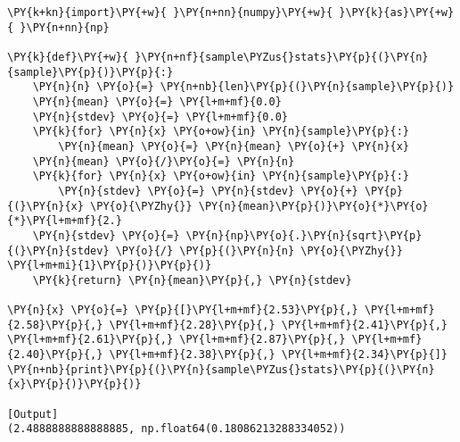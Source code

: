\begin{Verbatim}[label=\makebox{\href{https://github.com/unipi-physics-labs/statnotes/tree/main/snippy/sample_stat_naive.py}{https://github.com/.../sample\_stat\_naive.py}},commandchars=\\\{\}]
\PY{k+kn}{import}\PY{+w}{ }\PY{n+nn}{numpy}\PY{+w}{ }\PY{k}{as}\PY{+w}{ }\PY{n+nn}{np}

\PY{k}{def}\PY{+w}{ }\PY{n+nf}{sample\PYZus{}stats}\PY{p}{(}\PY{n}{sample}\PY{p}{)}\PY{p}{:}
    \PY{n}{n} \PY{o}{=} \PY{n+nb}{len}\PY{p}{(}\PY{n}{sample}\PY{p}{)}
    \PY{n}{mean} \PY{o}{=} \PY{l+m+mf}{0.0}
    \PY{n}{stdev} \PY{o}{=} \PY{l+m+mf}{0.0}
    \PY{k}{for} \PY{n}{x} \PY{o+ow}{in} \PY{n}{sample}\PY{p}{:}
        \PY{n}{mean} \PY{o}{=} \PY{n}{mean} \PY{o}{+} \PY{n}{x}
    \PY{n}{mean} \PY{o}{/}\PY{o}{=} \PY{n}{n}
    \PY{k}{for} \PY{n}{x} \PY{o+ow}{in} \PY{n}{sample}\PY{p}{:}
        \PY{n}{stdev} \PY{o}{=} \PY{n}{stdev} \PY{o}{+} \PY{p}{(}\PY{n}{x} \PY{o}{\PYZhy{}} \PY{n}{mean}\PY{p}{)}\PY{o}{*}\PY{o}{*}\PY{l+m+mf}{2.}
    \PY{n}{stdev} \PY{o}{=} \PY{n}{np}\PY{o}{.}\PY{n}{sqrt}\PY{p}{(}\PY{n}{stdev} \PY{o}{/} \PY{p}{(}\PY{n}{n} \PY{o}{\PYZhy{}} \PY{l+m+mi}{1}\PY{p}{)}\PY{p}{)}
    \PY{k}{return} \PY{n}{mean}\PY{p}{,} \PY{n}{stdev}

\PY{n}{x} \PY{o}{=} \PY{p}{[}\PY{l+m+mf}{2.53}\PY{p}{,} \PY{l+m+mf}{2.58}\PY{p}{,} \PY{l+m+mf}{2.28}\PY{p}{,} \PY{l+m+mf}{2.41}\PY{p}{,} \PY{l+m+mf}{2.61}\PY{p}{,} \PY{l+m+mf}{2.87}\PY{p}{,} \PY{l+m+mf}{2.40}\PY{p}{,} \PY{l+m+mf}{2.38}\PY{p}{,} \PY{l+m+mf}{2.34}\PY{p}{]}
\PY{n+nb}{print}\PY{p}{(}\PY{n}{sample\PYZus{}stats}\PY{p}{(}\PY{n}{x}\PY{p}{)}\PY{p}{)}

[Output]
(2.4888888888888885, np.float64(0.18086213288334052))
\end{Verbatim}
